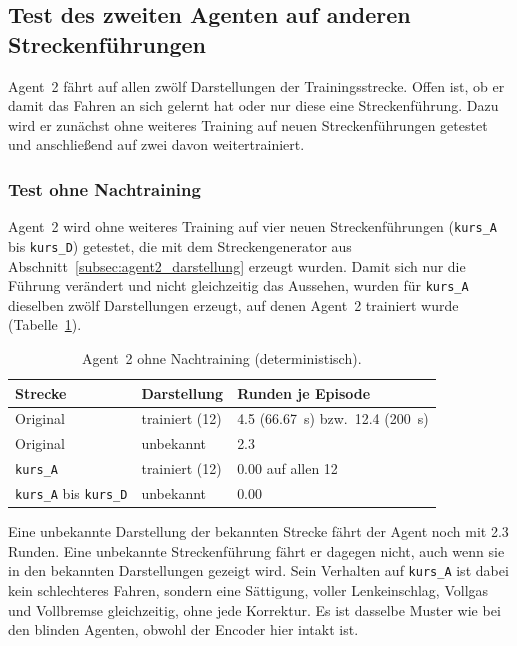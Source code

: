 \subsection{Test des zweiten Agenten auf anderen Streckenführungen}
\label{sec:andere_strecken}

Agent~2 fährt auf allen zwölf Darstellungen der Trainingsstrecke. Offen ist, ob er damit das Fahren an sich gelernt hat oder nur diese eine Streckenführung. Dazu wird er zunächst ohne weiteres Training auf neuen Streckenführungen getestet und anschließend auf zwei davon weitertrainiert.

\subsubsection{Test ohne Nachtraining}
\label{subsec:ohne_nachtraining}

Agent~2 wird ohne weiteres Training auf vier neuen Streckenführungen (\texttt{kurs\_A} bis \texttt{kurs\_D}) getestet, die mit dem Streckengenerator aus Abschnitt~\ref{subsec:agent2_darstellung} erzeugt wurden. Damit sich nur die Führung verändert und nicht gleichzeitig das Aussehen, wurden für \texttt{kurs\_A} dieselben zwölf Darstellungen erzeugt, auf denen Agent~2 trainiert wurde (Tabelle~\ref{tab:ohne_nachtraining}).

\begin{table}[htbp]
  \centering
  \caption{Agent~2 ohne Nachtraining (deterministisch).}
  \label{tab:ohne_nachtraining}
  \small
  \begin{tabular}{@{}l l l@{}}
    \toprule
    \textbf{Strecke} & \textbf{Darstellung} & \textbf{Runden je Episode} \\
    \midrule
    Original                              & trainiert (12) & \num{4.5} (\SI{66.67}{\second}) bzw.\ \num{12.4} (\SI{200}{\second}) \\
    Original                              & unbekannt      & \num{2.3} \\
    \texttt{kurs\_A}                      & trainiert (12) & \num{0.00} auf allen 12 \\
    \texttt{kurs\_A} bis \texttt{kurs\_D} & unbekannt      & \num{0.00} \\
    \bottomrule
  \end{tabular}
\end{table}

Eine unbekannte Darstellung der bekannten Strecke fährt der Agent noch mit \num{2.3} Runden. Eine unbekannte Streckenführung fährt er dagegen nicht, auch wenn sie in den bekannten Darstellungen gezeigt wird. Sein Verhalten auf \texttt{kurs\_A} ist dabei kein schlechteres Fahren, sondern eine Sättigung, voller Lenkeinschlag, Vollgas und Vollbremse gleichzeitig, ohne jede Korrektur. Es ist dasselbe Muster wie bei den blinden Agenten, obwohl der Encoder hier intakt ist.

